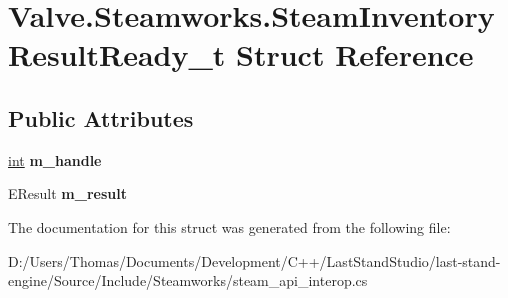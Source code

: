 \hypertarget{structValve_1_1Steamworks_1_1SteamInventoryResultReady__t}{}\section{Valve.\+Steamworks.\+Steam\+Inventory\+Result\+Ready\+\_\+t Struct Reference}
\label{structValve_1_1Steamworks_1_1SteamInventoryResultReady__t}
\subsection*{Public Attributes}
\begin{DoxyCompactItemize}
\item 
\hypertarget{structValve_1_1Steamworks_1_1SteamInventoryResultReady__t_a2218ceed0058b88f4c6ac38c75bd5307}{}\hyperlink{SDL__thread_8h_a6a64f9be4433e4de6e2f2f548cf3c08e}{int} {\bfseries m\+\_\+handle}\label{structValve_1_1Steamworks_1_1SteamInventoryResultReady__t_a2218ceed0058b88f4c6ac38c75bd5307}

\item 
\hypertarget{structValve_1_1Steamworks_1_1SteamInventoryResultReady__t_a28c9beb9d27c0f5a0d0b95537d912d4b}{}E\+Result {\bfseries m\+\_\+result}\label{structValve_1_1Steamworks_1_1SteamInventoryResultReady__t_a28c9beb9d27c0f5a0d0b95537d912d4b}

\end{DoxyCompactItemize}


The documentation for this struct was generated from the following file\+:\begin{DoxyCompactItemize}
\item 
D\+:/\+Users/\+Thomas/\+Documents/\+Development/\+C++/\+Last\+Stand\+Studio/last-\/stand-\/engine/\+Source/\+Include/\+Steamworks/steam\+\_\+api\+\_\+interop.\+cs\end{DoxyCompactItemize}
